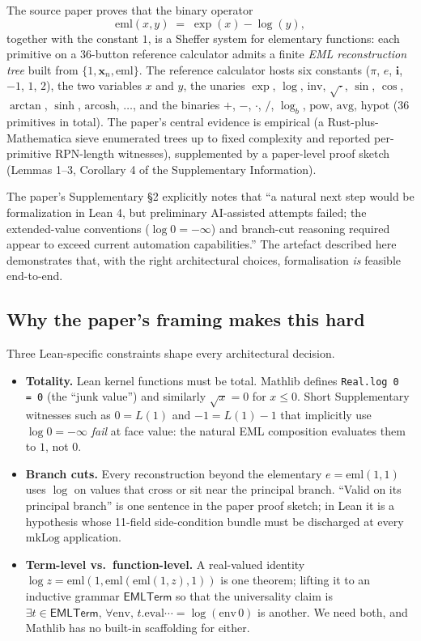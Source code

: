 \documentclass[11pt,a4paper]{article}
\theoremstyle{plain}
\theoremstyle{definition}
\newcommand{\eml}{\mathrm{eml}}
\newcommand{\imu}{\mathbf{i}}
\newcommand{\EMLT}{\mathsf{EMLTerm}}
\begin{document}
The source paper proves that the binary operator
\[
   \eml(x, y) \;=\; \exp(x) - \log(y),
\]
together with the constant $1$, is a Sheffer system for elementary
functions: each primitive on a 36-button reference calculator admits a
finite \emph{EML reconstruction tree} built from
$\{1, \mathbf{x}_n, \eml\}$. The reference calculator hosts six
constants ($\pi$, $e$, $\imu$, $-1$, $1$, $2$), the two variables
$x$ and $y$, the unaries $\exp$, $\log$, $\mathrm{inv}$,
$\sqrt{\cdot}$, $\sin$, $\cos$, $\arctan$, $\sinh$, $\mathrm{arcosh}$,
$\dots$, and the binaries $+$, $-$, $\cdot$, $/$, $\log_b$,
$\mathrm{pow}$, $\mathrm{avg}$, $\mathrm{hypot}$ ($36$ primitives in
total). The paper's central evidence is empirical (a
Rust-plus-Mathematica sieve enumerated trees up to fixed complexity
and reported per-primitive RPN-length witnesses), supplemented by a
paper-level proof sketch (Lemmas 1--3, Corollary 4 of the
Supplementary Information).

The paper's Supplementary §2 explicitly notes that ``a natural next
step would be formalization in Lean 4, but preliminary AI-assisted
attempts failed; the extended-value conventions ($\log 0 = -\infty$)
and branch-cut reasoning required appear to exceed current automation
capabilities.'' The artefact described here demonstrates that, with
the right architectural choices, formalisation \emph{is} feasible
end-to-end.

\subsection{Why the paper's framing makes this hard}

Three Lean-specific constraints shape every architectural decision.

\begin{itemize}[leftmargin=*]
  \item \textbf{Totality.} Lean kernel functions must be total. Mathlib
    defines \texttt{Real.log\,0\,=\,0} (the ``junk value'') and
    similarly $\sqrt{x} = 0$ for $x \leq 0$. Short Supplementary
    witnesses such as $0 = L(1)$ and $-1 = L(1) - 1$ that implicitly
    use $\log 0 = -\infty$ \emph{fail} at face value: the natural EML
    composition evaluates them to $1$, not $0$.
  \item \textbf{Branch cuts.} Every reconstruction beyond the
    elementary $e = \eml(1, 1)$ uses $\log$ on values that cross or
    sit near the principal branch. ``Valid on its principal branch''
    is one sentence in the paper proof sketch; in Lean it is a
    hypothesis whose 11-field side-condition bundle must be discharged
    at every $\mathrm{mkLog}$ application.
  \item \textbf{Term-level vs.~function-level.} A real-valued identity
    $\log z = \eml(1, \eml(\eml(1, z), 1))$ is one theorem; lifting it
    to an inductive grammar $\EMLT$ so that the universality claim is
    $\exists t \in \EMLT,\, \forall \mathrm{env},\,t.\mathrm{eval} \cdots
    = \log(\mathrm{env}\,0)$ is another. We need both, and Mathlib has
    no built-in scaffolding for either.
\end{itemize}
\end{document}
